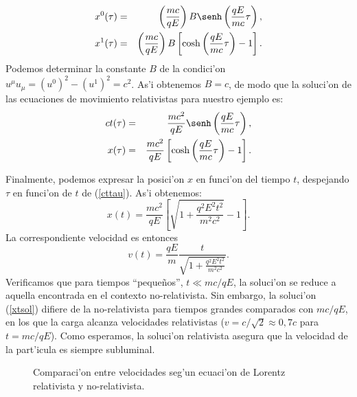 \begin{eqnarray}
x^0(\tau)&=&\left(\frac{mc}{qE}\right)B\senh\left(\frac{qE}{mc}\tau\right) ,\\
x^1(\tau)&=&\left(\frac{mc}{qE}\right)B\left[\cosh\left(
\frac{qE}{mc}\tau\right)-1\right] .
\end{eqnarray}
Podemos determinar la constante $B$ de la condici'on $u^\mu
u_\mu=(u^0)^2-(u^1)^2=c^2$. As'i obtenemos $B=c$, de modo que la
soluci'on de las ecuaciones de movimiento relativistas para nuestro ejemplo es:
\begin{eqnarray}
ct(\tau)&=&\frac{mc^2}{qE}\senh\left( \frac{qE}{mc}\tau\right), \label{cttau}\\
x(\tau)&=&\frac{mc^2}{qE}\left[ \cosh\left( \frac{qE}{mc}\tau\right)-1\right] .
\end{eqnarray}

Finalmente, podemos expresar la posici'on $x$ en funci'on del tiempo $t$,
despejando $\tau$ en funci'on de $t$ de (\ref{cttau}). As'i obtenemos:
\begin{equation}
x(t) = \frac{mc^2}{qE} \left[ \sqrt{1 + \frac{q^2 E^2 t^2}{m^2c^2}} - 1 \right].
\label{xtsol}
\end{equation}
La correspondiente velocidad es entonces
\begin{equation}
v(t) = \frac{qE}{m}\frac{t}{\sqrt{1 + \frac{q^2 E^2 t^2}{m^2c^2}}}.
\end{equation}
Verificamos que para tiempos ``peque\~nos'', $t\ll {mc}/{qE}$, la soluci'on se
reduce a aquella encontrada en el contexto no-relativista. Sin embargo, la
soluci'on (\ref{xtsol}) difiere de la no-relativista para tiempos grandes
comparados con ${mc}/{qE}$, en los que la carga alcanza velocidades
relativistas ($v={c}/{\sqrt{2}}\approx 0,7c$ para $t={mc}/{qE}$). Como esperamos, la soluci'on relativista asegura que la velocidad de la part'icula es siempre subluminal.

\begin{figure}
\begin{center}

\end{center}
\caption{Comparaci'on entre velocidades seg'un ecuaci'on de Lorentz relativista
y no-relativista.}
\end{figure}

